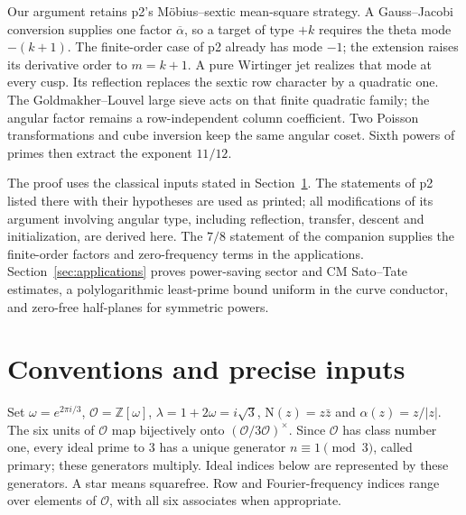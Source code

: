 \documentclass[11pt,a4paper]{article}
\numberwithin{equation}{section}
\theoremstyle{definition}
\theoremstyle{remark}
\newcommand{\Z}{\mathbb Z}
\newcommand{\OO}{\mathcal O}
\newcommand{\N}{\mathrm N}
\begin{document}
Our argument retains p2's M\"obius--sextic mean-square strategy. A Gauss--Jacobi conversion supplies one factor $\overline{\alpha}$, so a target of type $+k$ requires the theta mode $-(k+1)$. The finite-order case of p2 already has mode $-1$; the extension raises its derivative order to $m=k+1$. A pure Wirtinger jet realizes that mode at every cusp. Its reflection replaces the sextic row character by a quadratic one. The Goldmakher--Louvel large sieve acts on that finite quadratic family; the angular factor remains a row-independent column coefficient. Two Poisson transformations and cube inversion keep the same angular coset. Sixth powers of primes then extract the exponent $11/12$.

The proof uses the classical inputs stated in Section~\ref{sec:inputs}. The statements of p2 listed there with their hypotheses are used as printed; all modifications of its argument involving angular type, including reflection, transfer, descent and initialization, are derived here. The $7/8$ statement of the companion supplies the finite-order factors and zero-frequency terms in the applications. Section~\ref{sec:applications} proves power-saving sector and CM Sato--Tate estimates, a polylogarithmic least-prime bound uniform in the curve conductor, and zero-free half-planes for symmetric powers.

\section{Conventions and precise inputs}\label{sec:inputs}
Set $\omega=e^{2\pi i/3}$, $\OO=\Z[\omega]$, $\lambda=1+2\omega=i\sqrt3$, $\N(z)=z\bar z$ and $\alpha(z)=z/|z|$. The six units of $\OO$ map bijectively onto $(\OO/3\OO)^\times$. Since $\OO$ has class number one, every ideal prime to $3$ has a unique generator $n\equiv1\pmod3$, called primary; these generators multiply. Ideal indices below are represented by these generators. A star means squarefree. Row and Fourier-frequency indices range over elements of $\OO$, with all six associates when appropriate.
\end{document}
